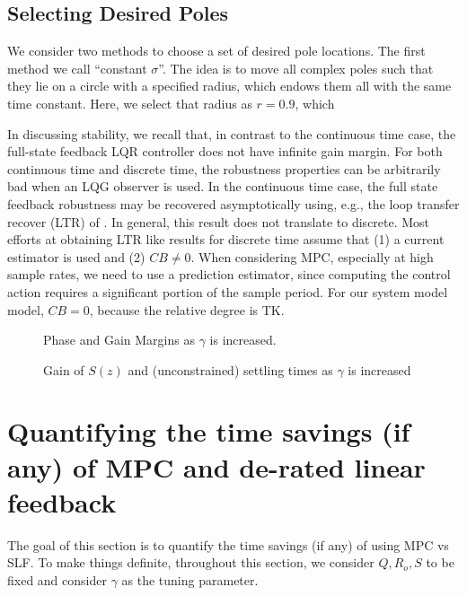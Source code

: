 \documentclass[journal,twocolumn,twoside]{IEEEtran}
\begin{document}
\subsection{Selecting Desired Poles}
We consider two methods to choose a set of desired pole locations. The first method we call ``constant $\sigma$''. The idea is to move all complex poles such that they lie on a circle with a specified radius, which endows them all with the same time constant. Here, we select that radius as $r=0.9$, which 



In discussing stability, we recall that, in contrast to the continuous time case, the full-state feedback LQR controller does not have infinite gain margin. For both continuous time and discrete time, the robustness properties can be arbitrarily bad when an LQG observer is used. In the continuous time case, the full state feedback robustness may be recovered asymptotically using, e.g., the loop transfer recover (LTR) of \cite{doyle_guaranteed_1978}. In general, this result does not translate to discrete. Most efforts at obtaining LTR like results for discrete time assume that (1) a current estimator is used and (2) $CB\neq 0$. When considering MPC, especially at high sample rates, we need to use a prediction estimator, since computing the control action requires a significant portion of the sample period. For our system model model, $CB=0$, because the relative degree is TK. 




\begin{figure*}
  \begin{minipage}{0.48\textwidth}
    
    \caption{Phase and Gain Margins as $\gamma$ is increased.}
  \end{minipage}
  \hfil
  \begin{minipage}{0.48\textwidth}
    
    \caption{Gain of $S(z)$ and (unconstrained) settling times as $\gamma$ is increased}
  \end{minipage}
  
\end{figure*}



\section{Quantifying the time savings (if any) of MPC and de-rated linear feedback}
\label{sec:org7edf36d}
The goal of this section is to quantify the time savings (if any) of using MPC vs SLF. To make things definite, throughout this section, we consider $Q, R_o, S$ to be fixed and consider $\gamma$ as the tuning parameter.
\end{document}
